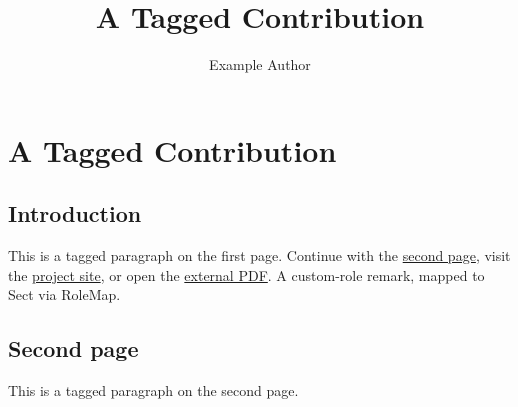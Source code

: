 \documentclass{article}
\title{A Tagged Contribution}
\author{Example Author}
\begin{document}
\section*{A Tagged Contribution}\tagmcend\tagstructend
{}
\subsection*{Introduction}\tagmcend\tagstructend
{}This is a tagged paragraph on the first page.
Continue with the \hyperlink{second-page}{second page}, visit the
\href{https://example.org/tagpax?source=test}{project site}, or open the
\href{other.pdf}{external PDF}.\tagmcend\tagstructend
{}A custom-role remark, mapped to Sect via RoleMap.\tagmcend\tagstructend
\newpage
\hypertarget{second-page}{}
\subsection*{Second page}\tagmcend\tagstructend
{}This is a tagged paragraph on the second page.\tagmcend\tagstructend
\tagstructend
\tagstructend
\end{document}
